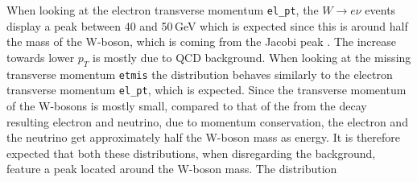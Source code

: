     When looking at the electron transverse momentum \texttt{el\_pt}, the $W \rightarrow e\nu$ events display a peak between 40 and 50\,GeV which is expected since this 
    is around half the mass of the W-boson, which is coming from the Jacobi peak \cite{atlaslabmanual}. The increase towards lower $p_T$ is mostly due to QCD background.
    When looking at the missing transverse momentum \texttt{etmis} the distribution behaves similarly to the electron transverse momentum \texttt{el\_pt}, which is expected.
    Since the transverse momentum of the W-bosons is mostly small, compared to that of the from the decay resulting electron and neutrino, due to momentum conservation, the 
    electron and the neutrino get approximately half the W-boson mass as energy. It is therefore expected that both these distributions, when disregarding the background, 
    feature a peak located around the W-boson mass. The distribution 

